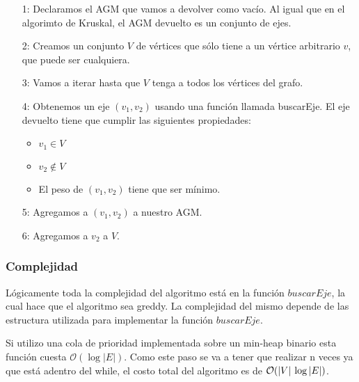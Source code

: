 \begin{enumerate}
\item [1:] Declaramos el AGM que vamos a devolver como vac\'io. Al igual que en el algorimto de Kruskal, el AGM devuelto es un conjunto de ejes.
\item [2:] Creamos un conjunto $V$ de v\'ertices que s\'olo tiene a un v\'ertice arbitrario $v$, que puede ser cualquiera.
\item [3:] Vamos a iterar hasta que $V$ tenga a todos los v\'ertices del grafo.
\item [4:] Obtenemos un eje $(v_1, v_2)$ usando una funci\'on llamada buscarEje. El eje devuelto tiene que cumplir las siguientes propiedades:
  \begin{itemize}
  \item $v_1 \in V$
  \item $v_2 \not \in V$
  \item El peso de $(v_1, v_2)$ tiene que ser m\'inimo.
  \end{itemize}
\item [5:] Agregamos a $(v_1, v_2)$ a nuestro AGM.
\item [6:] Agregamos a $v_2$ a $V$.
\end{enumerate}

\subsubsection*{Complejidad}

L\'ogicamente toda la complejidad del algoritmo est\'a en la funci\'on $buscarEje$, la cual hace que el algoritmo sea greddy. La complejidad del mismo depende de las estructura utilizada para implementar la funci\'on $buscarEje$.

Si utilizo una cola de prioridad implementada sobre un min-heap binario esta funci\'on cuesta $\mathcal{O}(\log{}|E|)$. Como este paso se va a tener que realizar n veces ya que est\'a adentro del while, el costo total del algoritmo es de $\mathcal{O}(|V|\hspace{2px}\log{}|E|)$.